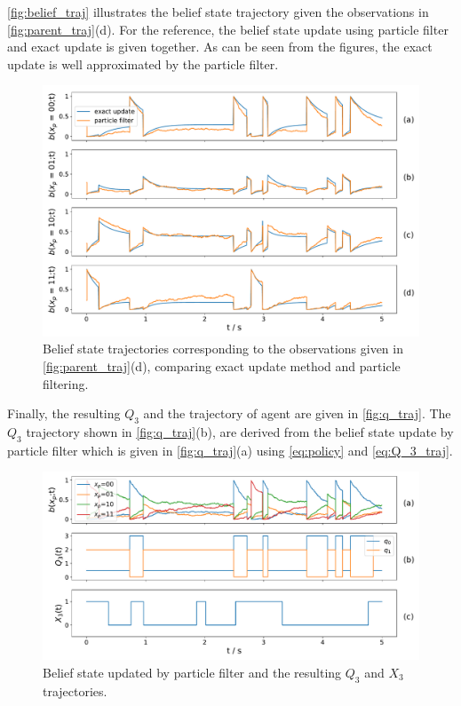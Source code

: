 \autoref{fig:belief_traj} illustrates the belief state trajectory given the observations in \autoref{fig:parent_traj}(d). For the reference, the belief state update using particle filter and exact update is given together. As can be seen from the figures, the exact update is well approximated by the particle filter.
\begin{figure}[H]
	\begin{center}
		\includegraphics[width=.9\textwidth]{figures/sim_example/belief_traj}
		\caption[Belief state trajectories]{Belief state trajectories corresponding to the observations given in \autoref{fig:parent_traj}(d), comparing exact update method and particle filtering.}
		\label{fig:belief_traj}
	\end{center}
\end{figure}
Finally, the resulting $ Q_3 $ and the trajectory of agent are given in \autoref{fig:q_traj}. The $ Q_3 $ trajectory shown in \autoref{fig:q_traj}(b), are derived from the belief state update by particle filter which is given in \autoref{fig:q_traj}(a) using \autoref{eq:policy} and \autoref{eq:Q_3_traj}.
\begin{figure}[H]
	\begin{center}
		\includegraphics[width=.9\textwidth]{figures/sim_example/q_traj}
		\caption[$ Q_3 $ and $ X_3 $ trajectories]{Belief state updated by particle filter and the resulting $ Q_3 $ and $ X_3 $ trajectories.}
		\label{fig:q_traj}
	\end{center}
\end{figure}
